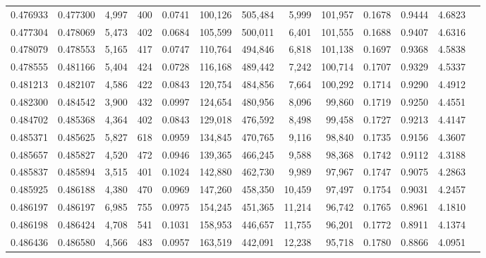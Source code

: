 \begin{tabular}{rrrrrrrrrrrrr}
0.476933 & 0.477300 & 4,997 &   400 &                                     0.0741 & 100,126 & 505,484 &   5,999 & 101,957 & 0.1678 & 0.9444 & 4.6823 \\
0.477304 & 0.478069 & 5,473 &   402 &                                     0.0684 & 105,599 & 500,011 &   6,401 & 101,555 & 0.1688 & 0.9407 & 4.6316 \\
0.478079 & 0.478553 & 5,165 &   417 &                                     0.0747 & 110,764 & 494,846 &   6,818 & 101,138 & 0.1697 & 0.9368 & 4.5838 \\
0.478555 & 0.481166 & 5,404 &   424 &                                     0.0728 & 116,168 & 489,442 &   7,242 & 100,714 & 0.1707 & 0.9329 & 4.5337 \\
0.481213 & 0.482107 & 4,586 &   422 &                                     0.0843 & 120,754 & 484,856 &   7,664 & 100,292 & 0.1714 & 0.9290 & 4.4912 \\
0.482300 & 0.484542 & 3,900 &   432 &                                     0.0997 & 124,654 & 480,956 &   8,096 &  99,860 & 0.1719 & 0.9250 & 4.4551 \\
0.484702 & 0.485368 & 4,364 &   402 &                                     0.0843 & 129,018 & 476,592 &   8,498 &  99,458 & 0.1727 & 0.9213 & 4.4147 \\
0.485371 & 0.485625 & 5,827 &   618 &                                     0.0959 & 134,845 & 470,765 &   9,116 &  98,840 & 0.1735 & 0.9156 & 4.3607 \\
0.485657 & 0.485827 & 4,520 &   472 &                                     0.0946 & 139,365 & 466,245 &   9,588 &  98,368 & 0.1742 & 0.9112 & 4.3188 \\
0.485837 & 0.485894 & 3,515 &   401 &                                     0.1024 & 142,880 & 462,730 &   9,989 &  97,967 & 0.1747 & 0.9075 & 4.2863 \\
0.485925 & 0.486188 & 4,380 &   470 &                                     0.0969 & 147,260 & 458,350 &  10,459 &  97,497 & 0.1754 & 0.9031 & 4.2457 \\
0.486197 & 0.486197 & 6,985 &   755 &                                     0.0975 & 154,245 & 451,365 &  11,214 &  96,742 & 0.1765 & 0.8961 & 4.1810 \\
0.486198 & 0.486424 & 4,708 &   541 &                                     0.1031 & 158,953 & 446,657 &  11,755 &  96,201 & 0.1772 & 0.8911 & 4.1374 \\
0.486436 & 0.486580 & 4,566 &   483 &                                     0.0957 & 163,519 & 442,091 &  12,238 &  95,718 & 0.1780 & 0.8866 & 4.0951 \\

\end{tabular}
